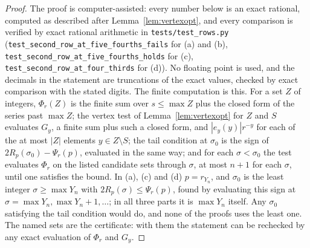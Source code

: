\documentclass[11pt]{article}
\begin{document}
\begin{proof}
The proof is computer-assisted: every number below is an exact rational,
computed as described after Lemma~\ref{lem:vertexopt}, and every comparison
is verified by exact rational arithmetic in \texttt{tests/test\_rows.py}
(\texttt{test\_second\_row\_at\_five\_fourths\_fails} for (a) and (b),
\texttt{test\_second\_row\_at\_five\_fourths\_holds} for (c),
\texttt{test\_second\_row\_at\_four\_thirds} for (d)).  No floating
point is used, and the decimals in the statement are truncations of the
exact values, checked by exact comparison with the stated digits.  The
finite computation is this.  For a set $Z$ of integers, $\Phi_r(Z)$ is the
finite sum over $s\le\max Z$ plus the closed form of the series past
$\max Z$; the vertex test of Lemma~\ref{lem:vertexopt} for $Z$ and $S$
evaluates $G_y$, a finite sum plus such a closed form, and
$|e_y(y)|r^{-y}$ for each of the at most $|Z|$ elements $y\in Z\setminus
S$; the tail condition at $\sigma_0$ is the sign of
$2R_p(\sigma_0)-\Psi_r(p)$, evaluated in the same way; and for each
$\sigma<\sigma_0$ the test evaluates $\Phi_r$ on the listed candidate
sets through $\sigma$, at most $n+1$ for each $\sigma$, until one
satisfies the bound.  In (a), (c) and (d) $p=r_{Y_n}$, and $\sigma_0$ is the least
integer $\sigma\ge\max Y_n$ with $2R_p(\sigma)\le\Psi_r(p)$, found by
evaluating this sign at $\sigma=\max Y_n,\max Y_n+1,\ldots$; in all three
parts it is $\max Y_n$ itself.  Any $\sigma_0$ satisfying the tail condition
would do, and none of the proofs uses the least one.  The named sets are the
certificate: with them the statement can be rechecked by any exact
evaluation of $\Phi_r$ and $G_y$.


\end{proof}
\end{document}
